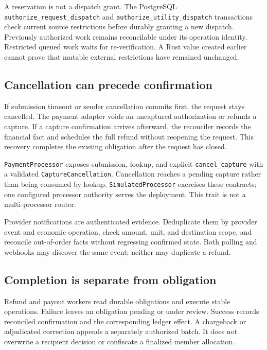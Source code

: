\documentclass[11pt]{article}
\begin{document}
A reservation is not a dispatch grant. The PostgreSQL
\texttt{authorize\_request\_dispatch} and \texttt{authorize\_utility\_dispatch}
transactions check current source restrictions before durably granting a new
dispatch. Previously authorized work remains reconcilable under its operation
identity. Restricted queued work waits for re-verification. A Rust value created
earlier cannot prove that mutable external restrictions have remained unchanged.

\subsection{Cancellation can precede confirmation}

If submission timeout or sender cancellation commits first, the request stays
cancelled. The payment adapter voids an uncaptured authorization or refunds a
capture. If a capture confirmation arrives afterward, the reconciler records the
financial fact and schedules the full refund without reopening the request.
This recovery completes the existing obligation after the request has closed.

\texttt{PaymentProcessor} exposes submission, lookup, and explicit
\texttt{cancel\_capture} with a validated \texttt{CaptureCancellation}.
Cancellation reaches a pending capture rather than being consumed by lookup.
\texttt{SimulatedProcessor} exercises these contracts; one configured processor
authority serves the deployment. This trait is not a multi-processor router.

Provider notifications are authenticated evidence. Deduplicate them by provider
event and economic operation, check amount, unit, and destination scope, and
reconcile out-of-order facts without regressing confirmed state. Both polling
and webhooks may discover the same event; neither may duplicate a refund.

\subsection{Completion is separate from obligation}

Refund and payout workers read durable obligations and execute stable operations.
Failure leaves an obligation pending or under review. Success records reconciled
confirmation and the corresponding ledger effect. A chargeback or adjudicated
correction appends a separately authorized batch. It does not overwrite a
recipient decision or confiscate a finalized member allocation.
\end{document}
